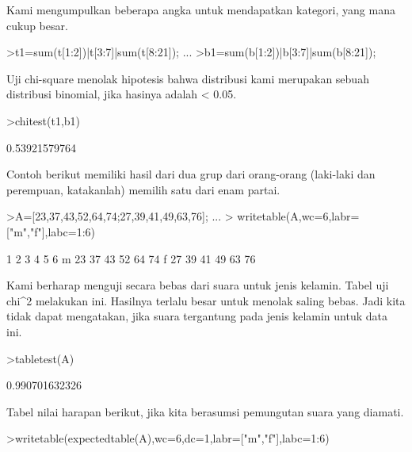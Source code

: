 \documentclass[a4paper,10pt]{article}
\begin{document}
\begin{eulernotebook}
\begin{eulercomment}
Kami mengumpulkan beberapa angka untuk mendapatkan kategori, yang mana
cukup besar.
\end{eulercomment}
\begin{eulerprompt}
>t1=sum(t[1:2])|t[3:7]|sum(t[8:21]); ...
>b1=sum(b[1:2])|b[3:7]|sum(b[8:21]);
\end{eulerprompt}
\begin{eulercomment}
Uji chi-square menolak hipotesis bahwa distribusi kami merupakan
sebuah distribusi binomial, jika hasinya adalah \textless{} 0.05.
\end{eulercomment}
\begin{eulerprompt}
>chitest(t1,b1)
\end{eulerprompt}
\begin{euleroutput}
  0.53921579764
\end{euleroutput}
\begin{eulercomment}
Contoh berikut memiliki hasil dari dua grup dari orang-orang
(laki-laki dan perempuan, katakanlah) memilih satu dari enam partai.
\end{eulercomment}
\begin{eulerprompt}
>A=[23,37,43,52,64,74;27,39,41,49,63,76];  ...
>  writetable(A,wc=6,labr=["m","f"],labc=1:6)
\end{eulerprompt}
\begin{euleroutput}
             1     2     3     4     5     6
       m    23    37    43    52    64    74
       f    27    39    41    49    63    76
\end{euleroutput}
\begin{eulercomment}
Kami berharap menguji secara bebas dari suara untuk jenis kelamin.
Tabel uji chi\textasciicircum{}2 melakukan ini. Hasilnya terlalu besar untuk menolak
saling bebas. Jadi kita tidak dapat mengatakan, jika suara tergantung
pada jenis kelamin untuk data ini.
\end{eulercomment}
\begin{eulerprompt}
>tabletest(A)
\end{eulerprompt}
\begin{euleroutput}
  0.990701632326
\end{euleroutput}
\begin{eulercomment}
Tabel nilai harapan berikut, jika kita berasumsi pemungutan suara yang
diamati.
\end{eulercomment}
\begin{eulerprompt}
>writetable(expectedtable(A),wc=6,dc=1,labr=["m","f"],labc=1:6)
\end{eulerprompt}
\begin{euleroutput}

\end{euleroutput}
\end{eulernotebook}
\end{document}

